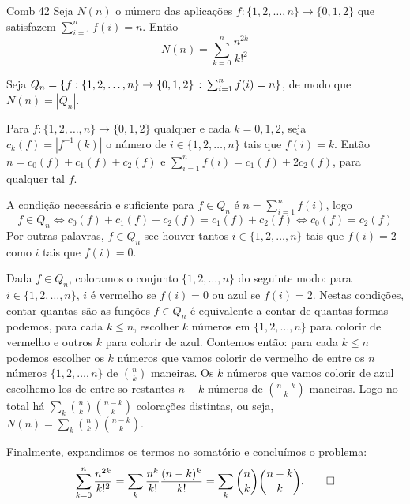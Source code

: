 \documentclass[base.tex]{subfiles}
\newcommand*{\sets}{\{0,1,2\}}
\newcommand*{\setn}{\{1,2,\dots,n\}}
\begin{document}
\begin{problem}{Comb 42}
Seja $N(n)$ o número das aplicações
$f:\setn\to\sets$
que satisfazem $\sum_{i=1}^n f(i)=n$.
Então
$$N(n)=\sum_{k=0}^n\frac{n^{2k}}{k!^2}$$
\end{problem}

\begin{solution}
Seja $Q_n=\{f:\setn\to\sets\suchthat\sum_{i=1}^n f(i)=n\}$,
de modo que $N(n)=|Q_n|$.

Para $f:\setn\to\sets$
qualquer e cada $k=0,1,2$, seja $c_k(f)=|f^{-1}(k)|$
o número de $i\in\setn$ tais que $f(i)=k$.
Então $n=c_0(f)+c_1(f)+c_2(f)$ e $\sum_{i=1}^n f(i)=
c_1(f)+2c_2(f)$, para qualquer tal $f$.

A condição necessária e suficiente para $f\in Q_n$ é
$n=\sum_{i=1}^n f(i)$, logo
\begin{equation*}
f\in Q_n
\Leftrightarrow c_0(f)+c_1(f)+c_2(f)=c_1(f)+c_2(f)
\Leftrightarrow c_0(f)=c_2(f)
\end{equation*}
Por outras palavras, $f\in Q_n$ see houver tantos
$i\in\setn$ tais que $f(i)=2$ como $i$
tais que $f(i)=0$.

Dada $f\in Q_n$, coloramos o conjunto $\setn$
do seguinte modo: para $i\in\setn$, $i$ é
vermelho se $f(i)=0$ ou azul se $f(i)=2$. Nestas
condições, contar quantas são as funções $f\in Q_n$
é equivalente a contar de quantas formas podemos, para
cada $k\leq n$, escolher $k$ números em $\setn$
para colorir de vermelho e outros $k$ para colorir de azul. Contemos então: para cada $k\leq n$ podemos escolher os $k$ números que vamos colorir de vermelho de entre os $n$ números $\setn$ de $\binom{n}{k}$ maneiras. Os $k$ números que vamos colorir de azul escolhemo-los de entre so restantes $n-k$ números de $\binom{n-k}{k}$ maneiras. Logo no total há $\sum_k\binom{n}{k}\binom{n-k}{k}$ colorações distintas, ou seja, $N(n)=\sum_k\binom{n}{k}\binom{n-k}{k}$.

Finalmente, expandimos os termos no somatório e concluímos o problema:
\begin{equation*}
\sum_{k=0}^n\frac{n^{2k}}{k!^2}
=\sum_k\frac{n^k}{k!}\frac{(n-k)^k}{k!}
=\sum_k\binom{n}{k}\binom{n-k}{k}.\qedhere
\end{equation*}
\end{solution}
\end{document}
